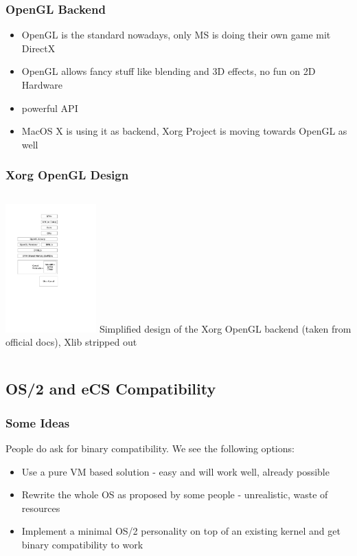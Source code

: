 \documentclass{beamer}
\begin{document}
\begin{frame}
\frametitle{OpenGL Backend}
\begin{itemize}[<+->]
  \item OpenGL is the standard nowadays, only MS is doing their own game mit DirectX
  \item OpenGL allows fancy stuff like blending and 3D effects, no fun on 2D Hardware
  \item powerful API
  \item MacOS X is using it as backend, Xorg Project is moving towards OpenGL as well
\end{itemize}
\end{frame}

\begin{frame}
\frametitle{Xorg OpenGL Design}
\begin{columns}
\column[T]{5cm}
\includegraphics[width=3.5cm]{ogl-backend.pdf}
\column{5cm}
Simplified design of the Xorg OpenGL backend (taken from official docs), Xlib stripped out
\end{columns}
\end{frame}

\subsection{OS/2 and eCS Compatibility}
\begin{frame}
\frametitle{Some Ideas}
People do ask for binary compatibility. We see the following options:
\begin{itemize}[<+->]
  \item Use a pure VM based solution - easy and will work well, already possible
  \item Rewrite the whole OS as proposed by some people - unrealistic, waste of resources
  \item Implement a minimal OS/2 personality on top of an existing kernel and get binary compatibility to work
\end{itemize}
\end{frame}
\end{document}
